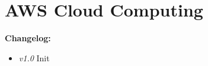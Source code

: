 \chapter{AWS Cloud Computing}
\setcounter{section}{0}

\textbf{Changelog:} \\
\begin{itemize}
	\item \textit{v1.0} Init 
\end{itemize}
\pagebreak

\renewcommand{\abstractname}{Abstract}